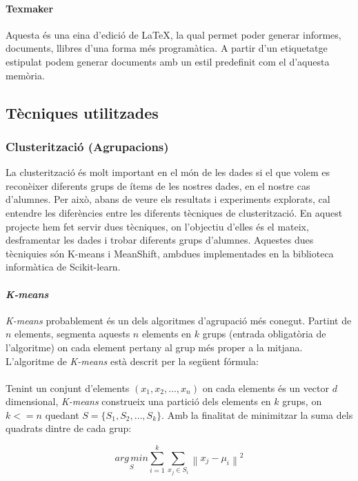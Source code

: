 \documentclass[11pt,a4paper,catalan]{article}
\begin{document}
\paragraph{Texmaker}
Aquesta és una eina d'edició de \LaTeX, la qual permet poder generar informes, documents, llibres d'una forma més programàtica. A partir d'un etiquetatge estipulat podem generar documents amb un estil predefinit com el d'aquesta memòria.

\newpage
\hypertarget{tecniquesutilitzades}{
	\subsection{Tècniques utilitzades}
}
\subsubsection{Clusterització (Agrupacions)}
La clusterització és molt important en el món de les dades si el que volem es reconèixer diferents grups de ítems de les nostres dades, en el nostre cas d'alumnes. Per això, abans de veure els resultats i experiments explorats, cal entendre les diferències entre les diferents tècniques de clusterització. En aquest projecte hem fet servir dues tècniques, on l'objectiu d'elles és el mateix, desframentar les dades i trobar diferents grups d'alumnes. Aquestes dues tècniquies són K-means i MeanShift, ambdues implementades en la biblioteca informàtica de Scikit-learn. 

\paragraph{\textit{K-means}}
\textit{K-means} probablement és un dels algoritmes d'agrupació més conegut. Partint de $n$ elements, segmenta aquests $n$ elements en $k$ grups (entrada obligatòria de l'algoritme) on cada element pertany al grup més proper a la mitjana. L'algoritme de \textit{K-means} està descrit per la següent fórmula:
\\
\\
Tenint un conjunt d'elements $(x_1, x_2, \ldots, x_n)$ on cada elements és un vector $d$ dimensional, \textit{K-means} construeix una partició dels elements en $k$ grups, on $k <= n$ quedant $S = \{S_1, S_2, \ldots, S_k\}$. Amb la finalitat de minimitzar la suma dels quadrats dintre de cada grup:

$$ \underset{S} {arg\,min} \sum_{i=1}^{k} \sum_{x_j \in S_i} \left\| x_j - \mu_i \right\|^2 $$
\end{document}
